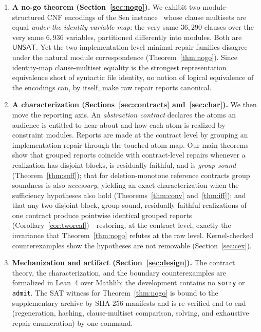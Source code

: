\documentclass[sigplan,10pt,review,anonymous,nonacm]{acmart}
\theoremstyle{acmdefinition}
\newcommand{\code}[1]{\texttt{#1}}
\newcommand{\UNSAT}{\mathsf{UNSAT}}
\begin{document}
\begin{enumerate}[leftmargin=1.6em]
\item \textbf{A no-go theorem (Section~\ref{sec:nogo}).}
We exhibit two
module-structured CNF encodings of the Sen instance~\cite{Sen1970} whose
clause multisets are equal
\emph{under the identity variable map}: the very same $36{,}290$ clauses over
the very same $6{,}936$ variables, partitioned differently into modules. Both
are $\UNSAT$. Yet the two implementation-level minimal-repair families
disagree under the natural module correspondence
(Theorem~\ref{thm:nogo}).
Since identity-map clause-multiset equality is the
strongest representation equivalence short of syntactic file identity, no
notion of logical equivalence of the encodings can, by itself, make raw repair
reports canonical.

\item \textbf{A characterization (Sections~\ref{sec:contracts}
and~\ref{sec:char}).} We then move the reporting axis. An \emph{abstraction
contract} declares the atoms an audience is entitled to hear about and how
each atom is realized by constraint modules. Reports are made at the contract
level by grouping an implementation repair through the touched-atom map.
Our main theorems show that grouped reports coincide with contract-level
repairs whenever a realization has disjoint blocks, is residually faithful,
and is \emph{group sound} (Theorem~\ref{thm:suff}); that for deletion-monotone
reference contracts group soundness is also \emph{necessary}, yielding an
exact characterization when the sufficiency hypotheses also hold
(Theorems~\ref{thm:conv} and~\ref{thm:iff}); and that any two disjoint-block,
group-sound, residually faithful realizations of one contract produce
pointwise identical grouped reports (Corollary~\ref{cor:tworeal})---restoring, at the contract
level, exactly the invariance that Theorem~\ref{thm:nogo} refutes at the raw
level. Kernel-checked counterexamples show the hypotheses are not removable
(Section~\ref{sec:cex}).

\item \textbf{Mechanization and artifact (Section~\ref{sec:design}).}
The
contract theory, the characterization, and the boundary counterexamples are
formalized in Lean~4 over Mathlib; the development contains no \code{sorry}
or \code{admit}. The SAT witness for Theorem~\ref{thm:nogo} is bound to the
supplementary archive by SHA-256 manifests and is re-verified end to end
(regeneration, hashing, clause-multiset comparison, solving, and exhaustive
repair enumeration) by one command.
\end{enumerate}
\end{document}
